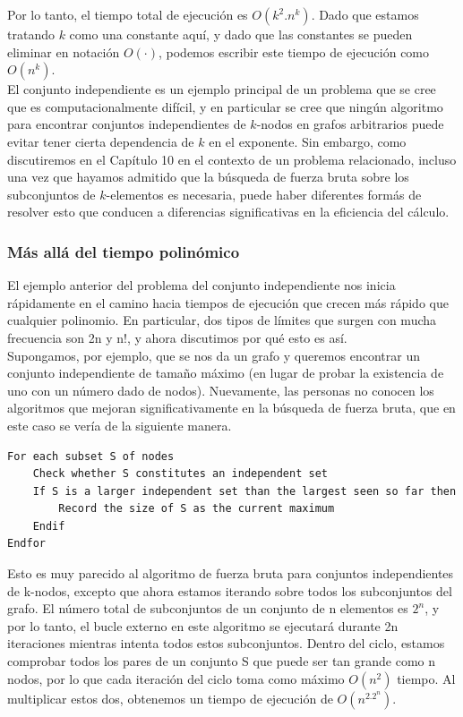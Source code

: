 \documentclass[a4paper, 12pt]{book}
\theoremstyle{dotless}
\begin{document}
Por lo tanto, el tiempo total de ejecución es $O(k^2.n^k)$. Dado que estamos tratando $k$ como una constante aquí, y dado que las constantes se pueden eliminar en notación $O(·)$, podemos escribir este tiempo de ejecución como $O(n^k)$.\\

El conjunto independiente es un ejemplo principal de un problema que se cree que es
computacionalmente difícil, y en particular se cree que ningún algoritmo para encontrar conjuntos independientes de $k$-nodos en grafos arbitrarios puede evitar tener cierta dependencia de $k$ en el exponente. Sin embargo, como discutiremos en el Capítulo 10 en el contexto de un problema relacionado, incluso una vez que hayamos admitido que la búsqueda de fuerza bruta sobre los subconjuntos de $k$-elementos es necesaria, puede haber diferentes formás de resolver esto que conducen a diferencias significativas en la eficiencia del cálculo.\\


\subsubsection*{Más allá del tiempo polinómico} 

El ejemplo anterior del problema del conjunto independiente nos inicia rápidamente en el camino hacia tiempos de ejecución que crecen más rápido que cualquier polinomio. En particular, dos tipos de límites que surgen con mucha frecuencia son 2n y n!, y ahora discutimos por qué esto es así.\\

Supongamos, por ejemplo, que se nos da un grafo y queremos encontrar un conjunto independiente de tamaño máximo (en lugar de probar la existencia de uno con un número dado de nodos). Nuevamente, las personas no conocen los algoritmos que mejoran significativamente en la búsqueda de fuerza bruta, que en este caso se vería de la siguiente manera.
 
\begin{lstlisting}
For each subset S of nodes
	Check whether S constitutes an independent set
	If S is a larger independent set than the largest seen so far then
		Record the size of S as the current maximum
	Endif
Endfor
\end{lstlisting}

Esto es muy parecido al algoritmo de fuerza bruta para conjuntos independientes de k-nodos, excepto que ahora estamos iterando sobre todos los subconjuntos del grafo. El número total de subconjuntos de un conjunto de n elementos es $2^n$, y por lo tanto, el bucle externo en este algoritmo se ejecutará durante 2n iteraciones mientras intenta todos estos subconjuntos. Dentro del ciclo, estamos comprobar todos los pares de un conjunto S que puede ser tan grande como n nodos, por lo que cada iteración del
ciclo toma como máximo $O(n^2)$ tiempo. Al multiplicar estos dos, obtenemos un tiempo de ejecución de $O(n^2.2^n)$.\\
\end{document}
